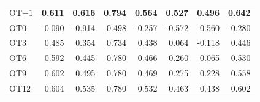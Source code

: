 {\begin{longtable}{@{}lrrrrrrr@{}}
OT$-1$ & \textbf{\phantom{-}0.611} & \textbf{\phantom{-}0.616} & \textbf{\phantom{-}0.794} & \textbf{\phantom{-}0.564} & \textbf{\phantom{-}0.527} & \textbf{\phantom{-}0.496} & \textbf{\phantom{-}0.642} \\
OT0 & -0.090 & -0.914 & \phantom{-}0.498 & -0.257 & -0.572 & -0.560 & -0.280 \\
OT3 & \phantom{-}0.485 & \phantom{-}0.354 & \phantom{-}0.734 & \phantom{-}0.438 & \phantom{-}0.064 & -0.118 & \phantom{-}0.446 \\
OT6 & \phantom{-}0.592 & \phantom{-}0.445 & \phantom{-}0.780 & \phantom{-}0.466 & \phantom{-}0.260 & \phantom{-}0.065 & \phantom{-}0.530 \\
OT9 & \phantom{-}0.602 & \phantom{-}0.495 & \phantom{-}0.780 & \phantom{-}0.469 & \phantom{-}0.275 & \phantom{-}0.228 & \phantom{-}0.558 \\
OT12 & \phantom{-}0.604 & \phantom{-}0.535 & \phantom{-}0.780 & \phantom{-}0.532 & \phantom{-}0.463 & \phantom{-}0.438 & \phantom{-}0.602 \\
\end{longtable}
}

